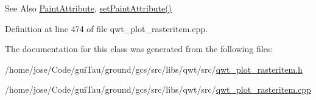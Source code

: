 \begin{DoxySeeAlso}{See Also}
\hyperlink{class_qwt_plot_raster_item_a75ac68ea258b8612e8a1893e845394ee}{Paint\-Attribute}, \hyperlink{class_qwt_plot_raster_item_a70d6b94821e5eafb29b1f045d1f3a2e6}{set\-Paint\-Attribute()} 
\end{DoxySeeAlso}


Definition at line 474 of file qwt\-\_\-plot\-\_\-rasteritem.\-cpp.



The documentation for this class was generated from the following files\-:\begin{DoxyCompactItemize}
\item 
/home/jose/\-Code/gui\-Tau/ground/gcs/src/libs/qwt/src/\hyperlink{qwt__plot__rasteritem_8h}{qwt\-\_\-plot\-\_\-rasteritem.\-h}\item 
/home/jose/\-Code/gui\-Tau/ground/gcs/src/libs/qwt/src/\hyperlink{qwt__plot__rasteritem_8cpp}{qwt\-\_\-plot\-\_\-rasteritem.\-cpp}\end{DoxyCompactItemize}
